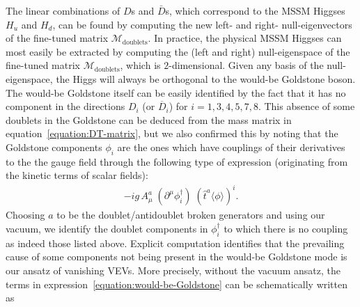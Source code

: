\documentclass[a4paper,12pt]{article}
\begin{document}
The linear combinations of $D$s and $\bar{D}$s, which correspond to the MSSM Higgses $H_u$ and $H_d$, can be found by computing the new left- and right- null-eigenvectors of the fine-tuned matrix $\mathcal{M}_{\textrm{doublets}}$. In practice, the
physical MSSM Higgses can most easily be extracted by computing the (left and right) null-eigenspace of the fine-tuned matrix $\mathcal{M}_{\textrm{doublets}}$, which is $2$-dimensional. Given any basis of the null-eigenspace, the Higgs will always be orthogonal to the would-be Goldstone boson. The would-be Goldstone itself can be easily identified by the fact that it has no component in the directions $D_i$ (or $\overline{D}_i$) for $i=1,3,4,5,7,8$. This absence of some doublets in the Goldstone can be deduced from the mass matrix in equation~\eqref{equation:DT-matrix}, but we also confirmed this by noting that the Goldstone components $\phi_i$ are the ones which have couplings of their derivatives to the the gauge field through the following type of expression (originating from the kinetic terms of scalar fields):
\begin{align}
-ig\,A_{\mu}^{a}\;(\partial^\mu \phi^\dagger_i) \;(\hat{t}^a \langle\phi\rangle)^i.\label{equation:would-be-Goldstone}
\end{align}
Choosing $a$ to be the doublet/antidoublet broken generators and using our vacuum,  we identify the doublet components in $\phi^\dagger_i$ to which there is no coupling as indeed those listed above. Explicit computation identifies that the prevailing cause of some components not being present in the would-be Goldstone mode is our ansatz of vanishing VEVs. More precisely, without the vacuum ansatz, the terms in expression~\eqref{equation:would-be-Goldstone} can be schematically written as
\end{document}
